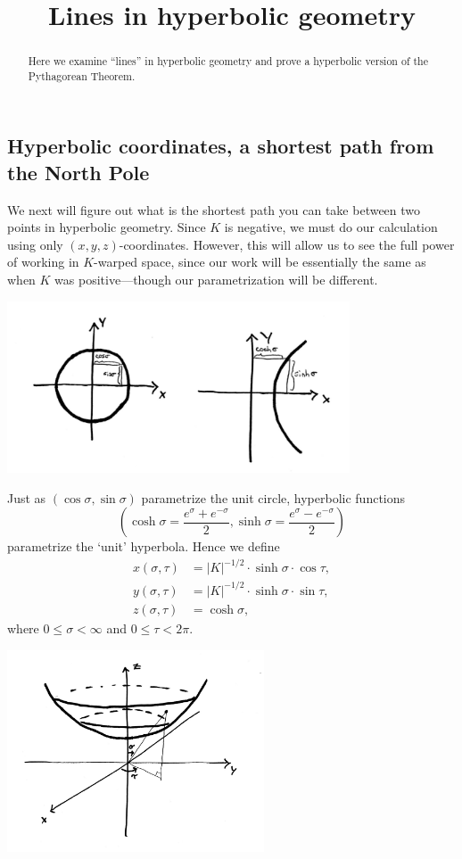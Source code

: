 \documentclass{ximera}
\title{Lines in hyperbolic geometry}
\begin{document}
\begin{abstract}
Here we examine ``lines'' in hyperbolic geometry and prove a
hyperbolic version of the Pythagorean Theorem.
\end{abstract}
\maketitle

\subsection*{Hyperbolic coordinates, a shortest path from the North Pole}

We next will figure out what is the shortest path you can take between
two points in hyperbolic geometry. Since $K$ is negative, we must do
our calculation using only $(x,y,z)$-coordinates. However, this will
allow us to see the full power of working in $K$-warped space, since
our work will be essentially the same as when $K$ was positive---though
our parametrization will be different.
\begin{image}
\includegraphics[width=4in]{trigVsHyp.jpg}
\end{image}


Just as $(\cos\sigma,\sin\sigma)$ parametrize the unit circle,
hyperbolic functions
\[
\left(
\cosh\sigma=\frac{e^{\sigma}+e^{-\sigma}}{2},
\sinh\sigma=\frac{e^{\sigma}-e^{-\sigma}}{2}
\right)
\]
parametrize the `unit' hyperbola. Hence we define
\begin{align*}
  x(\sigma,\tau) &=|K|^{-1/2}\cdot \sinh \sigma\cdot\cos \tau,\\
  y(\sigma,\tau) &=|K|^{-1/2}\cdot\sinh\sigma\cdot\sin \tau,\\
  z(\sigma,\tau) &=\cosh \sigma,
\end{align*}
where $0\le \sigma< \infty$ and $0\le \tau<2\pi$.

\begin{image}
  \includegraphics[width=3in]{hyperbolicPara.jpg}
\end{image}
\end{document}
